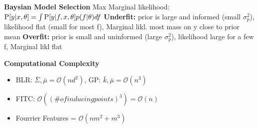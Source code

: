 \textbf{Baysian Model Selection}
Max Marginal likelihood: $\prob{y|x, \theta} = \int \prob {y|f,x,\theta}p(f|\theta)df$
\textbf{Underfit:} prior is large and informed (small $\sigma_{p}^{2}$), likelihood flat (small for most f), Marginal likl. most mass on y close to prior mean
\textbf{Overfit:} prior is small and uninformed (large $\sigma_{p}^{2}$), likelihood large for a few f, Marginal likl flat


\textbf{Computational Complexity}
\begin{itemize}
    \item BLR: $\bar{\Sigma},\bar{\mu} = \mathcal{O}(nd^{2})$, GP: $\bar{k},\bar{\mu} = \mathcal{O}(n^{3})$
    \item FITC: $\mathcal{O}((\# of inducing points)^{3}) = \mathcal{O}(n)$
    \item Fourrier Features = $\mathcal{O}(nm^{2}+m^{3})$
\end{itemize}

